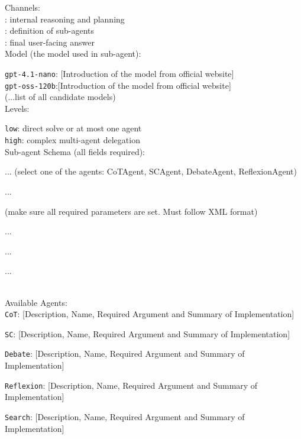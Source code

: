 \begin{developprompt}[title={Develop Prompt}]
Channels: \\
    : internal reasoning and planning \\
    : definition of sub-agents \\
    : final user-facing answer \\

Model (the model used in sub-agent):

    \texttt{gpt-4.1-nano}: [Introduction of the model from official website] \\
    \texttt{gpt-oss-120b}:[Introduction of the model from official website] \\
    (...list of all candidate models)\\

\masness Levels:

    \texttt{low}: direct solve or at most one agent \\
    \texttt{high}: complex multi-agent delegation\\

Sub-agent Schema (all fields required):\\


\quad{}
...
(select one of the agents: CoTAgent, SCAgent, DebateAgent, ReflexionAgent)

\quad{}
...

\quad{}
(make sure all required parameters are set. Must follow XML format)

\qquad{}...

\qquad{}...

\quad{}

\quad{}
...

 \\

Available Agents: \\

\texttt{CoT}: [Description, Name, Required Argument and Summary of Implementation]

\texttt{SC}: [Description, Name, Required Argument and Summary of Implementation]

\texttt{Debate}: [Description, Name, Required Argument and Summary of Implementation]

\texttt{Reflexion}: [Description, Name, Required Argument and Summary of Implementation]

\texttt{Search}: [Description, Name, Required Argument and Summary of Implementation]


\end{developprompt}

